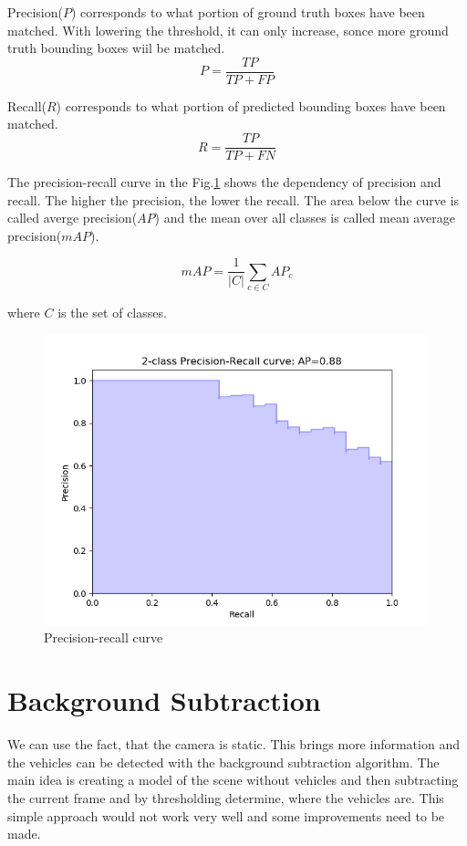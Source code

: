 \documentclass[a4paper,12pt,titlepage, twoside]{article}
\numberwithin{figure}{section}
\begin{document}
Precision($P$) corresponds to what portion of ground truth boxes have been matched. With lowering the threshold, it can only increase, sonce more ground truth bounding boxes wiil be matched.
\begin{equation}
P = \frac{TP}{TP + FP}
\end{equation}

Recall($R$) corresponds to what portion of predicted bounding boxes have been matched. 
\begin{equation}
R = \frac{TP}{TP + FN}
\end{equation}

The precision-recall curve in the Fig.\ref{fig:precision-recall} shows the dependency of precision and recall. The higher the precision, the lower the recall. The area below the curve is called averge precision($AP$) and the mean over all classes is called mean average precision($mAP$).

\begin{equation}
mAP = \frac{1}{|C|} \sum_{c \in C} AP_c
\end{equation}

where $C$ is the set of classes.

\begin{figure}[h]
\centering
\includegraphics[width=1\linewidth]{fig/precision-recall.png}
\caption{Precision-recall curve}
\label{fig:precision-recall}
\end{figure}




\section{Background Subtraction}
We can use the fact, that the camera is static. This brings more information and the vehicles can be detected with the background subtraction algorithm. The main idea is creating a model of the scene without vehicles and then subtracting the current frame and by thresholding determine, where the vehicles are. This simple approach would not work very well and some improvements need to be made. 
\end{document}
